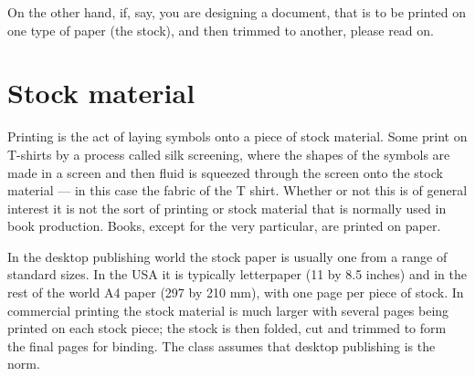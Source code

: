 On the other hand, if, say, you are designing a document, that is to
be printed on one type of paper (the stock), and then trimmed to
another, please read on.


  







\section{Stock material}
\label{sec:stock-material}

Printing is the act of laying symbols onto a piece of
stock material.  Some print on T-shirts by a process
called silk screening, where the shapes of the symbols are made in a
screen and then fluid is squeezed through the screen onto the stock
material --- in this case the fabric of the T shirt. Whether or not
this is of general interest it is not the sort of printing or stock
material that is normally used in book production. Books, except for
the very particular, are printed on paper.

    In the desktop publishing world the stock
paper is usually one from a range of standard sizes. 
In the USA it is typically
letterpaper 
(11 by 8.5 inches) and in the 
rest of the world A4 paper 
(297 by 210 mm), with one page per piece of stock. In commercial 
printing the stock material is 
much larger with several 
pages being printed on each stock piece; 
the stock is then folded, cut and trimmed to form
the final pages for binding. The class assumes that desktop publishing is 
the norm.


